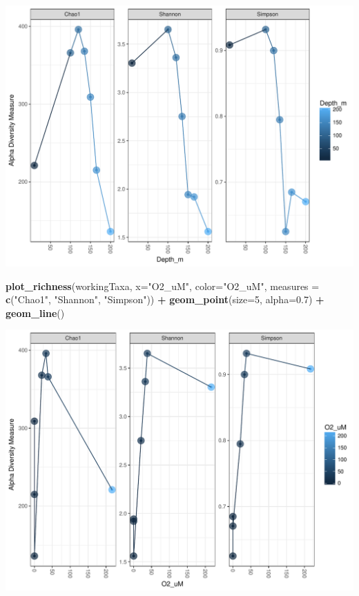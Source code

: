 \documentclass[11 pt,]{article}
\newenvironment{Shaded}{\begin{snugshade}}{\end{snugshade}}
\newcommand{\KeywordTok}[1]{\textcolor[rgb]{0.13,0.29,0.53}{\textbf{#1}}}
\newcommand{\DataTypeTok}[1]{\textcolor[rgb]{0.13,0.29,0.53}{#1}}
\newcommand{\DecValTok}[1]{\textcolor[rgb]{0.00,0.00,0.81}{#1}}
\newcommand{\FloatTok}[1]{\textcolor[rgb]{0.00,0.00,0.81}{#1}}
\newcommand{\StringTok}[1]{\textcolor[rgb]{0.31,0.60,0.02}{#1}}
\newcommand{\OperatorTok}[1]{\textcolor[rgb]{0.81,0.36,0.00}{\textbf{#1}}}
\newcommand{\NormalTok}[1]{#1}
\begin{document}
\includegraphics{Figs/unnamed-chunk-15-1.pdf}

\begin{Shaded}
\begin{Highlighting}[]
\KeywordTok{plot_richness}\NormalTok{(workingTaxa, }\DataTypeTok{x=}\StringTok{"O2_uM"}\NormalTok{, }\DataTypeTok{color=}\StringTok{"O2_uM"}\NormalTok{, }\DataTypeTok{measures =} \KeywordTok{c}\NormalTok{(}\StringTok{"Chao1"}\NormalTok{, }\StringTok{"Shannon"}\NormalTok{, }\StringTok{"Simpson"}\NormalTok{)) }\OperatorTok{+}\StringTok{ }\KeywordTok{geom_point}\NormalTok{(}\DataTypeTok{size=}\DecValTok{5}\NormalTok{, }\DataTypeTok{alpha=}\FloatTok{0.7}\NormalTok{) }\OperatorTok{+}\StringTok{ }\KeywordTok{geom_line}\NormalTok{()}
\end{Highlighting}
\end{Shaded}

\includegraphics{Figs/unnamed-chunk-15-2.pdf}
\end{document}
